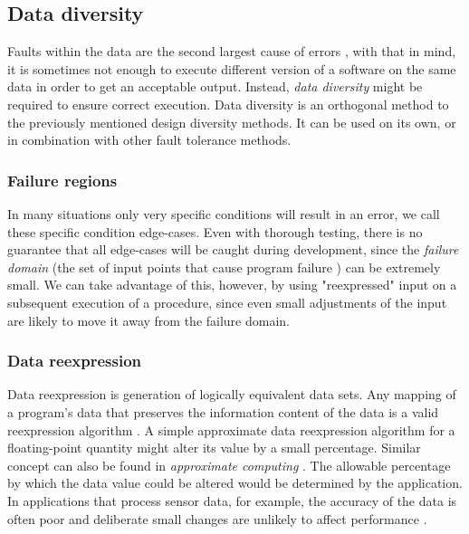 \subsection{Data diversity}

Faults within the data are the second largest cause of errors \cite{nasa:stats}, with that in mind, it is sometimes not enough to execute different version of a software on the same data in order to get an acceptable output. Instead, \textit{data diversity} \cite{nasa:datadiversity} might be required to ensure correct execution. Data diversity is an orthogonal method to the previously mentioned design diversity methods. It can be used on its own, or in combination with other fault tolerance methods.

\subsubsection{Failure regions}

In many situations only very specific conditions will result in an error, we call these specific condition edge-cases. Even with thorough testing, there is no guarantee that all edge-cases will be caught during development, since the \textit{failure domain} (the set of input points that cause program failure \cite{dd:sft}) can be extremely small. We can take advantage of this, however, by using "reexpressed" input on a subsequent execution of a procedure, since even small adjustments of the input are likely to move it away from the failure domain. 
 
\subsubsection{Data reexpression}

Data reexpression is generation of logically equivalent data sets. Any mapping of a program's data that preserves the information content of the data is a valid reexpression algorithm \cite{nasa:datadiversity}. A simple approximate data reexpression algorithm for a floating-point quantity might alter its value by a small percentage. Similar concept can also be found in \textit{approximate computing} \cite{approxcomp}. The allowable percentage by which the data value could be altered would be determined by the application. In applications that process sensor data, for example, the accuracy of the data is often poor and deliberate small changes are unlikely to affect performance \cite{nasa:datadiversity}. 

